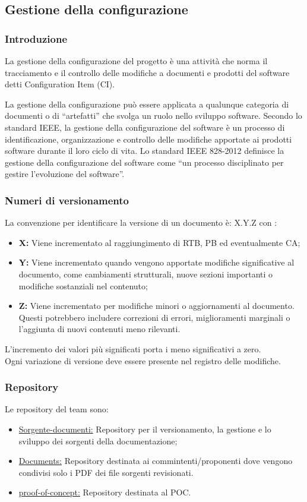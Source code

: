\subsection{Gestione della configurazione}
\subsubsection{Introduzione}
La gestione della configurazione del progetto è una attività che norma il tracciamento e il controllo delle modifiche a documenti e prodotti del software detti Configuration Item (CI).

La gestione della configurazione può essere applicata a qualunque categoria di documenti o di “artefatti” che svolga un ruolo nello sviluppo software.
Secondo lo standard IEEE, la gestione della configurazione del software è un processo di identificazione, organizzazione e controllo delle modifiche apportate ai prodotti software durante il loro ciclo di vita.
Lo standard IEEE 828-2012 definisce la gestione della configurazione del software come “un processo disciplinato per gestire l’evoluzione del software”.
\subsubsection{Numeri di versionamento}\label{sec:versionamento}
La convenzione per identificare la versione di un documento è: X.Y.Z
con :
\begin{itemize}
    \item \textbf{X: }Viene incrementato al raggiungimento di RTB, PB ed eventualmente CA;
    \item \textbf{Y: }Viene incrementato quando vengono apportate modifiche significative al documento, come cambiamenti strutturali, nuove sezioni importanti o modifiche sostanziali nel contenuto;
    \item \textbf{Z: }Viene incrementato per modifiche minori o aggiornamenti al documento. Questi potrebbero includere correzioni di errori, miglioramenti marginali o l'aggiunta di nuovi contenuti meno rilevanti.
\end{itemize}

L'incremento dei valori più significati  porta i meno significativi a zero. \\
Ogni variazione di versione deve essere presente nel registro delle modifiche.


\subsubsection{Repository}
Le repository del team sono:
\begin{itemize}
    \item \href{https://github.com/ByteOps-swe/Sorgente-documenti}{Sorgente-documenti:} Repository per il versionamento, la gestione e lo sviluppo dei sorgenti della documentazione;
    \item \href{https://github.com/ByteOps-swe/Documents}{Documents:} Repository destinata ai commintenti/proponenti dove vengono condivisi solo i PDF dei file sorgenti revisionati.
    \item \href{https://github.com/ByteOps-swe/proof-of-concept}{proof-of-concept:} Repository destinata al POC.
\end{itemize}
